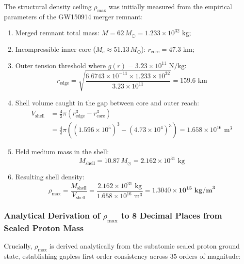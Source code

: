\documentclass[11pt,a4paper]{article}
\begin{document}
The structural density ceiling $\rho_{\max}$ was initially measured from the empirical parameters of the GW150914 merger remnant:
\begin{enumerate}
    \item Merged remnant total mass: $M = 62\,M_\odot = 1.233 \times 10^{32}\text{ kg}$;
    \item Incompressible inner core ($M_c \approx 51.13\,M_\odot$): $r_{\text{core}} = 47.3\text{ km}$;
    \item Outer tension threshold where $g(r) = 3.23 \times 10^{11}\text{ N/kg}$:
    \begin{equation}
    r_{\text{edge}} = \sqrt{\frac{6.6743 \times 10^{-11} \times 1.233 \times 10^{32}}{3.23 \times 10^{11}}} = 159.6\text{ km}
    \end{equation}
    \item Shell volume caught in the gap between core and outer reach:
    \begin{equation}
    \begin{aligned} V_{\text{shell}} &= \frac{4}{3}\pi \left( r_{\text{edge}}^3 - r_{\text{core}}^3 \right) \\ &= \frac{4}{3}\pi \left( (1.596 \times 10^5)^3 - (4.73 \times 10^4)^3 \right) = 1.658 \times 10^{16}\text{ m}^3 \end{aligned}
    \end{equation}
    \item Held medium mass in the shell:
    \begin{equation}
    M_{\text{shell}} = 10.87\,M_\odot = 2.162 \times 10^{31}\text{ kg}
    \end{equation}
    \item Resulting shell density:
    \begin{equation}
    \rho_{\max} = \frac{M_{\text{shell}}}{V_{\text{shell}}} = \frac{2.162 \times 10^{31}\text{ kg}}{1.658 \times 10^{16}\text{ m}^3} = \mathbf{1.3040 \times 10^{15}\text{ kg/m}^3}
    \end{equation}
\end{enumerate}

\subsubsection{Analytical Derivation of $\rho_{\max}$ to 8 Decimal Places from Sealed Proton Mass}
\label{subsubsec:rho_max_analytical}

Crucially, $\rho_{\max}$ is derived analytically from the subatomic sealed proton ground state, establishing gapless first-order consistency across 35 orders of magnitude:
\end{document}
